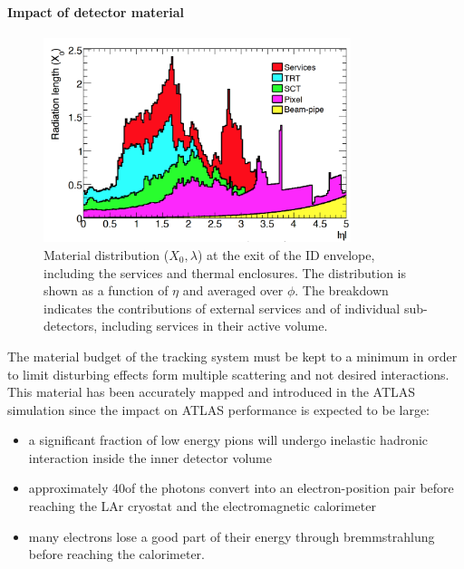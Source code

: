\paragraph{Impact of detector material}
\begin{figure}
\centering
\includegraphics[width=0.8\textwidth]{Images/atlas/IDMatX0.png}
\caption{Material distribution ($X_0,\lambda$) at the exit of the ID envelope, including the services and thermal enclosures. The distribution is shown as a function of $\eta$ and averaged over $\phi$. The breakdown indicates the contributions of external services and of individual sub-detectors, including services in their active volume.}
\label{fig:matbud_x0}
\end{figure}
The material budget of the tracking system must be kept to a minimum in order to limit disturbing effects form multiple scattering and not desired interactions.
This material has been accurately mapped and introduced in the ATLAS simulation since the impact on ATLAS performance is expected to be large:

\begin{itemize}
\item a significant fraction of low energy pions will undergo inelastic hadronic interaction inside the inner detector volume
\item approximately 40\percent of the photons convert into an electron-position pair before reaching the LAr cryostat and the electromagnetic calorimeter
\item many electrons lose a good part of their energy through bremmstrahlung before reaching the calorimeter.
\end{itemize}

